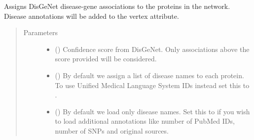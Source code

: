 \documentclass[letterpaper,10pt,english]{sphinxmanual}
\begin{document}
\begin{fulllineitems}
\begin{fulllineitems}
\end{fulllineitems}


\begin{fulllineitems}
\label{\detokenize{main:pypath.main.PyPath.load_ddis}}
\end{fulllineitems}


\begin{fulllineitems}
\label{\detokenize{main:pypath.main.PyPath.load_depod_dmi}}
\end{fulllineitems}


\begin{fulllineitems}
\label{\detokenize{main:pypath.main.PyPath.load_disgenet}}
Assigns DisGeNet disease-gene associations to the proteins
in the network. Disease annotations will be added to the 
vertex attribute.
\begin{quote}\begin{description}
\item[{Parameters}] \leavevmode\begin{itemize}
\item {} 
 () \textendash{} Confidence score from DisGeNet. Only associations
above the score provided will be considered.

\item {} 
 () \textendash{} By default we assign a list of disease names to
each protein. To use Unified Medical Language System IDs instead
set this to .

\item {} 
 () \textendash{} By default we load only disease names. Set this
to  if you wish to load additional annotations like number
of PubMed IDs, number of SNPs and original sources.


\end{itemize}
\end{description}
\end{quote}
\end{fulllineitems}
\end{fulllineitems}
\end{document}
